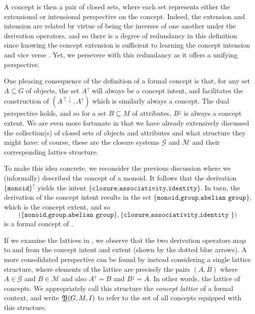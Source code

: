 A concept is then a pair of closed sets, where each set represents either the
extensional or intensional perspective on the concept. Indeed, the extension and
intension are related by virtue of being the inverses of one another under the
derivation operators, and so there is a degree of redundancy in this definition since
knowing the concept extension is sufficient to learning the concept intension and
vice verse \cite{ganter2016conceptual}. Yet, we persevere with this redundancy as
it offers a unifying perspective.

One pleasing consequence of the definition of a formal concept is that, for any
set $A\subseteq G$ of objects, the set $A^{\uparrow}$ will always be a concept intent,
and facilitates the construction of $(A^{\uparrow \downarrow}, A^{\uparrow})$
which is similarly always a concept. The dual perspective holds, and so for a
set $B \subseteq M$ of attributes, $B^{\downarrow}$ is always a concept extent.
We are even more fortunate in that we have already extensively discussed the
collection(s) of closed sets of objects and attributes and what structure they might
have: of course, these are the closure systems $\mathcal{G}$ and $\mathcal{M}$ and
their corresponding lattice structure.

To make this idea concrete, we reconsider the previous discussion where we (informally)
described the concept of a monoid. It follows that the derivation $\{\texttt{monoid
}\}^{\uparrow}$ yields the intent $\{\texttt{closure,associativity,identity}\}$.
In turn, the derivation of the concept intent results in the set $\{\texttt{monoid,group,abelian
group}\}$, which is the concept extent, and so
\[
  \big(\{\texttt{monoid,group,abelian group}\}, \{\texttt{closure,associativity,identity
  }\}\big)
\]
is a formal concept of .

If we examine the lattices in , we observe that the
two derivation operators map to and from the concept intent and extent (shown by
the dotted blue arrows). A more consolidated perspective can be found by instead
considering a single lattice structure, where elements of the lattice are
precisely the pairs $(A,B)$ where $A \in \mathcal{G}$ and $B \in \mathcal{M}$
and also $A^{\uparrow}= B$ and $B^{\downarrow}= A$. In other words, the lattice
of concepts. We appropriately call this structure the \textit{concept lattice}
of a formal context, and write $\underline{{\mathfrak B}} (G,M,\mathrel{I})$ to refer to the set of all concepts equipped
with this structure.

